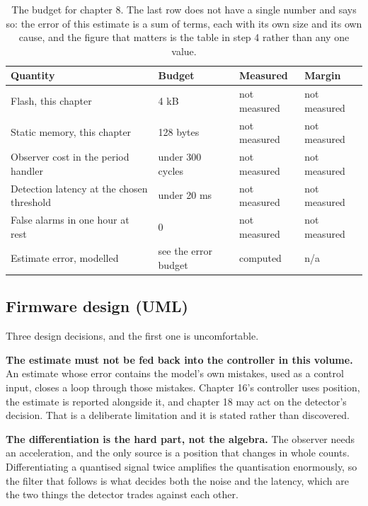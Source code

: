 \begin{table}[H]\centering\small
\begin{tabular}{p{44mm}p{28mm}p{28mm}p{30mm}}
\toprule
Quantity & Budget & Measured & Margin \\
\midrule
Flash, this chapter & 4 kB & not measured & not measured \\
Static memory, this chapter & 128 bytes & not measured & not measured \\
Observer cost in the period handler & under 300 cycles & not measured & not measured \\
Detection latency at the chosen threshold & under 20 ms & not measured & not measured \\
False alarms in one hour at rest & 0 & not measured & not measured \\
Estimate error, modelled & see the error budget & computed & n/a \\
\bottomrule
\end{tabular}
\caption{The budget for chapter 8. The last row does not have a single number and says so: the error of this estimate is a sum of terms, each with its own size and its own cause, and the figure that matters is the table in step 4 rather than any one value.}
\end{table}

\subsection*{Firmware design (UML)}


Three design decisions, and the first one is uncomfortable.

\textbf{The estimate must not be fed back into the controller in this volume.}
An estimate whose error contains the model's own mistakes, used as a control
input, closes a loop through those mistakes. Chapter 16's controller uses
position, the estimate is reported alongside it, and chapter 18 may act on the
detector's decision. That is a deliberate limitation and it is stated rather
than discovered.

\textbf{The differentiation is the hard part, not the algebra.} The observer
needs an acceleration, and the only source is a position that changes in whole
counts. Differentiating a quantised signal twice amplifies the quantisation
enormously, so the filter that follows is what decides both the noise and the
latency, which are the two things the detector trades against each other.


